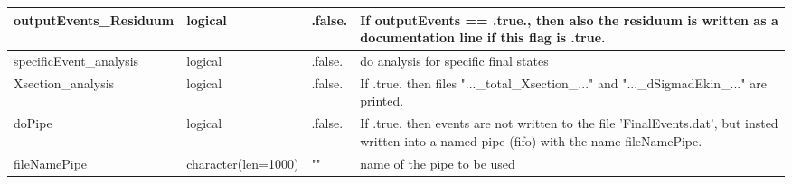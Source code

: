 \documentclass{article}
\begin{document}
\begin{longtable}{llll}
\midrule
outputEvents\_Residuum & \begin{minipage}[t]{2cm}logical\end{minipage} & \begin{minipage}[t]{2cm}.false.\end{minipage} & \begin{minipage}[t]{12cm}If outputEvents == .true., then also the residuum is written as a documentation line if this flag is .true.\end{minipage}\\*
\midrule
specificEvent\_analysis & \begin{minipage}[t]{2cm}logical\end{minipage} & \begin{minipage}[t]{2cm}.false.\end{minipage} & \begin{minipage}[t]{12cm}do analysis for specific final states\end{minipage}\\*
\midrule
Xsection\_analysis & \begin{minipage}[t]{2cm}logical\end{minipage} & \begin{minipage}[t]{2cm}.false.\end{minipage} & \begin{minipage}[t]{12cm}If .true. then files "...\_total\_Xsection\_..."  and "...\_dSigmadEkin\_..." are printed.\end{minipage}\\*
\midrule
doPipe & \begin{minipage}[t]{2cm}logical\end{minipage} & \begin{minipage}[t]{2cm}.false.\end{minipage} & \begin{minipage}[t]{12cm}If .true. then events are not written to the file 'FinalEvents.dat', but insted written into a named pipe (fifo) with the name fileNamePipe.\end{minipage}\\*
\midrule
fileNamePipe & \begin{minipage}[t]{2cm}character(len=1000)\end{minipage} & \begin{minipage}[t]{2cm}""\end{minipage} & \begin{minipage}[t]{12cm}name of the pipe to be used\end{minipage}\\*

\end{longtable}
\end{document}
